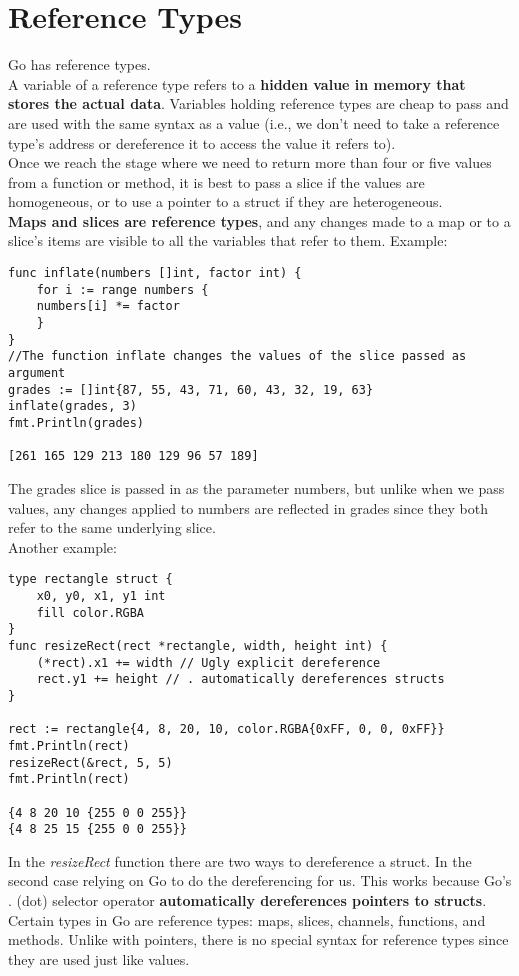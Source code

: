 \documentclass[10pt,letterpaper]{report}
\begin{document}
\section{Reference Types}
Go has reference types.\\
A variable of a reference type refers to a \textbf{hidden value in memory that stores the actual data}. Variables holding reference types are cheap to pass and are used with the same syntax as a value (i.e., we don't need to take a reference type's address or dereference it to access the value it refers to).\\
Once we reach the stage where we need to return more than four or five values from a function or method, it is best to pass a slice if the values are homogeneous, or to use a pointer to a struct if they are heterogeneous.\\
\textbf{Maps and slices are reference types}, and any changes made to a map or to a slice's items are visible to all the variables that refer to them. Example:
\begin{lstlisting}
func inflate(numbers []int, factor int) {
	for i := range numbers {
	numbers[i] *= factor
	}
}
//The function inflate changes the values of the slice passed as argument
grades := []int{87, 55, 43, 71, 60, 43, 32, 19, 63}
inflate(grades, 3)
fmt.Println(grades)

[261 165 129 213 180 129 96 57 189]
\end{lstlisting}
The grades slice is passed in as the parameter numbers, but unlike when we pass values, any changes applied to numbers are reflected in grades since they both refer to the same underlying slice.\\
Another example:
\begin{lstlisting}
type rectangle struct {
	x0, y0, x1, y1 int
	fill color.RGBA
}
func resizeRect(rect *rectangle, width, height int) {
	(*rect).x1 += width // Ugly explicit dereference
	rect.y1 += height // . automatically dereferences structs
}

rect := rectangle{4, 8, 20, 10, color.RGBA{0xFF, 0, 0, 0xFF}}
fmt.Println(rect)
resizeRect(&rect, 5, 5)
fmt.Println(rect)

{4 8 20 10 {255 0 0 255}}
{4 8 25 15 {255 0 0 255}}
\end{lstlisting}
In the \textit{resizeRect} function there are two ways to dereference a struct. In the second case relying on Go to do the dereferencing for us. This works because Go's . (dot) selector operator \textbf{automatically dereferences pointers to structs}.\\
Certain types in Go are reference types: maps, slices, channels, functions, and methods. Unlike with pointers, there is no special syntax for reference types since they are used just like values.\\
\end{document}

